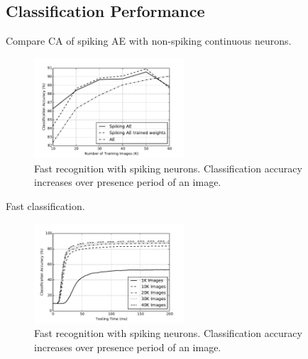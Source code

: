 \documentclass[conference]{IEEEtran}
\begin{document}
\subsection{Classification Performance}
Compare CA of spiking AE with non-spiking continuous neurons. 
	\begin{figure}
		\centering
		\includegraphics[width=0.5\textwidth]{recog_comp}
		\caption{Fast recognition with spiking neurons. Classification accuracy increases over presence period of an image.}
		\label{fig:recog_comp}		
	\end{figure}

Fast classification.
	\begin{figure}
		\centering
		\includegraphics[width=0.5\textwidth]{recog_speed}
		\caption{Fast recognition with spiking neurons. Classification accuracy increases over presence period of an image.}
		\label{fig:recog_speed}		
	\end{figure}


%
%
\end{document}
